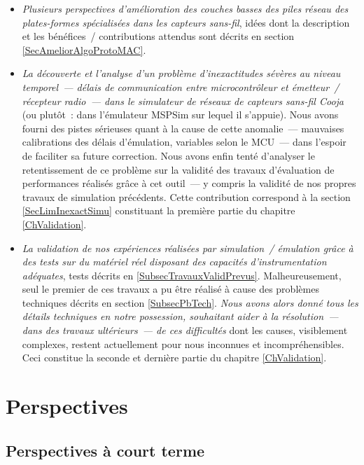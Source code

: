\begin{itemize}
\item \emph{Plusieurs perspectives d'amélioration des couches basses des
piles réseau des plates-formes spécialisées dans les capteurs sans-fil},
idées dont la description et les bénéfices~/ contributions attendus sont
décrits en section \vref{SecAmeliorAlgoProtoMAC}.

\item \emph{La découverte et l'analyse d'un problème d'inexactitudes sévères
au niveau temporel~--- délais de communication entre microcontrôleur et
émetteur~/ récepteur radio~--- dans le simulateur de réseaux de capteurs
sans-fil Cooja} (ou plutôt~: dans l'émulateur MSPSim sur lequel il s'appuie).
Nous avons fourni des pistes sérieuses quant à la cause de cette anomalie~---
mauvaises calibrations des délais d'émulation, variables selon le MCU~---
dans l'espoir de faciliter sa future correction. Nous avons enfin tenté
d'analyser le retentissement de ce problème sur la validité des travaux
d'évaluation de performances réalisés grâce à cet outil~--- y compris
la validité de nos propres travaux de simulation précédents. Cette
contribution correspond à la section \vref{SecLimInexactSimu} constituant
la première partie du chapitre \ref{ChValidation}.

\item \emph{La validation de nos expériences réalisées par simulation~/
émulation grâce à des tests sur du matériel réel disposant des capacités
d'instrumentation adéquates}, tests décrits en \vref{SubsecTravauxValidPrevus}.
Malheureusement, seul le premier de ces travaux a pu être réalisé à cause
des problèmes techniques décrits en section \vref{SubsecPbTech}.
\emph{Nous avons alors donné tous les détails techniques en notre possession,
souhaitant aider à la résolution~--- dans des travaux ultérieurs~--- de ces
difficultés} dont les causes, visiblement complexes, restent actuellement
pour nous inconnues et incompréhensibles. Ceci constitue la seconde et
dernière partie du chapitre \ref{ChValidation}.

\end{itemize}


\section{Perspectives}
\label{SecPerspectives}


\subsection{Perspectives à court terme}
\label{SubsecPerspCourt}

